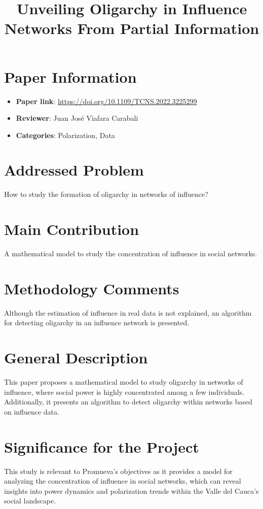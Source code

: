 \documentclass{article}
\title{Unveiling Oligarchy in Influence Networks From Partial Information}
\author{}
\date{}
\begin{document}
\maketitle

\section*{Paper Information}
\begin{itemize}
    \item \textbf{Paper link}: \url{https://doi.org/10.1109/TCNS.2022.3225299}
    \item \textbf{Reviewer}: Juan José Viafara Carabali
    \item \textbf{Categories}: Polarization, Data
\end{itemize}

\section*{Addressed Problem}
How to study the formation of oligarchy in networks of influence?

\section*{Main Contribution}
A mathematical model to study the concentration of influence in social networks.

\section*{Methodology Comments}
Although the estimation of influence in real data is not explained, an algorithm for detecting oligarchy in an influence network is presented.

\section*{General Description}
This paper proposes a mathematical model to study oligarchy in networks of influence, where social power is highly concentrated among a few individuals. Additionally, it presents an algorithm to detect oligarchy within networks based on influence data.

\section*{Significance for the Project}
This study is relevant to Promueva's objectives as it provides a model for analyzing the concentration of influence in social networks, which can reveal insights into power dynamics and polarization trends within the Valle del Cauca's social landscape.
\end{document}
